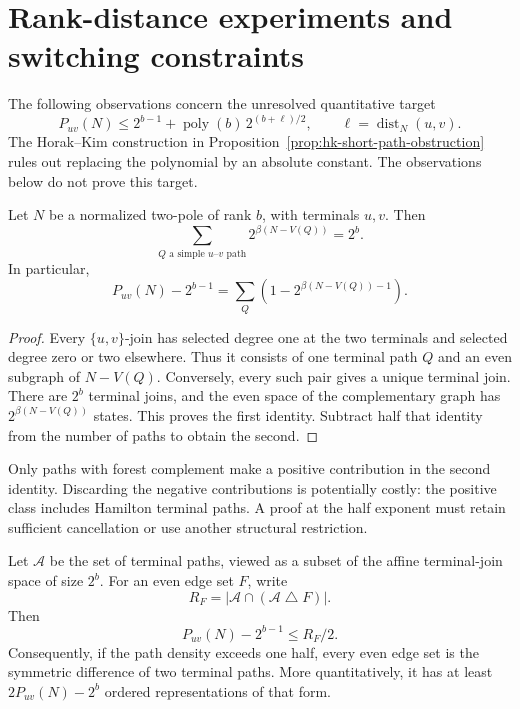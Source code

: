 \section{Rank-distance experiments and switching constraints}
\label{sec:path-rank-distance-structure}

The following observations concern the unresolved quantitative target
\[
 P_{uv}(N)\le2^{b-1}+\operatorname{poly}(b)\,2^{(b+\ell)/2},
 \qquad \ell=\operatorname{dist}_N(u,v).
\]
The Horak--Kim construction in Proposition~\ref{prop:hk-short-path-obstruction} rules out replacing the polynomial by an absolute constant.
The observations below do not prove this target.

\begin{lemma}
\label{lem:path-complement-partition}
Let $N$ be a normalized two-pole of rank $b$, with terminals $u,v$.
Then
\[
 \sum_{Q\text{ a simple }u\text{--}v\text{ path}}
 2^{\beta(N-V(Q))}=2^b.
\]
In particular,
\[
 P_{uv}(N)-2^{b-1}
 =\sum_Q\left(1-2^{\beta(N-V(Q))-1}\right).
\]
\end{lemma}

\begin{proof}
Every $\{u,v\}$-join has selected degree one at the two terminals and selected degree zero or two elsewhere.
Thus it consists of one terminal path $Q$ and an even subgraph of $N-V(Q)$.
Conversely, every such pair gives a unique terminal join.
There are $2^b$ terminal joins, and the even space of the complementary graph has $2^{\beta(N-V(Q))}$ states.
This proves the first identity.
Subtract half that identity from the number of paths to obtain the second.
\end{proof}

Only paths with forest complement make a positive contribution in the second identity.
Discarding the negative contributions is potentially costly: the positive class includes Hamilton terminal paths.
A proof at the half exponent must retain sufficient cancellation or use another structural restriction.

\begin{lemma}
\label{lem:path-switching-excess}
Let $\mathcal A$ be the set of terminal paths, viewed as a subset of the affine terminal-join space of size $2^b$.
For an even edge set $F$, write
\[
 R_F=|\mathcal A\cap(\mathcal A\mathbin\triangle F)|.
\]
Then
\[
 P_{uv}(N)-2^{b-1}\le R_F/2.
\]
Consequently, if the path density exceeds one half, every even edge set is the symmetric difference of two terminal paths.
More quantitatively, it has at least $2P_{uv}(N)-2^b$ ordered representations of that form.
\end{lemma}

